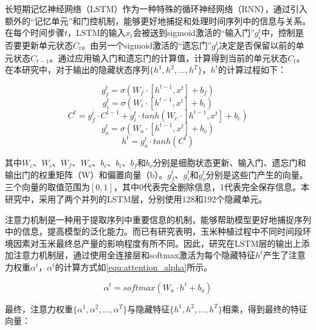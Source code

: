 \par 长短期记忆神经网络（LSTM）作为一种特殊的循环神经网络（RNN），通过引入额外的“记忆单元”和门控机制，能够更好地捕捉和处理时间序列中的信息与关系\cite{LI2019104785}。在每个时间步骤$t$，LSTM的输入$x_t$会被送到sigmoid激活的“输入门”$g_i^t$中，控制是否要更新单元状态$C_t$。由另一个sigmoid激活的“遗忘门”$g_f^t$决定是否保留以前的单元状态$C_{t-1}$。通过应用输入门和遗忘门的计算值，计算得到当前的单元状态$C_t$。在本研究中，对于输出的隐藏状态序列$\{h^1, h^2, ..., h^T\}$，$h^t$的计算过程如下：

\begin{equation}
  \label{equ:lstm1}
  g_f^t=\sigma (W_f\cdot [h^{t-1}, x^t]+b_f)
\end{equation}
\begin{equation}
  \label{equ:lstm2}
  g_i^t=\sigma (W_i\cdot [h^{t-1}, x^t]+b_i)
\end{equation}
\begin{equation}
  \label{equ:lstm3}
  C^t=g_f^t\cdot C^{t-1}+g_i^t\cdot tanh(W_c\cdot [h^{t-1}, x^t]+b_c)
\end{equation}
\begin{equation}
  \label{equ:lstm4}
  g_o^t=\sigma (W_o\cdot [h^{t-1}, x^t]+b_o)
\end{equation}
\begin{equation}
  \label{equ:lstm5}
  h^t=g_o^t\cdot tanh(C^t)
\end{equation}

\par 其中$W_c$、$W_i$、$W_f$、$W_o$、$b_c$、$b_i$、$b_f$和$b_o$分别是细胞状态更新、输入门、遗忘门和输出门的权重矩阵（W）和偏置向量（b）。$g_f^t$、$g_i^t$和$g_o^t$分别是这些门产生的向量。三个向量的取值范围为$[0,1]$，其中0代表完全删除信息，1代表完全保存信息。本研究中，采用了两个并列的LSTM层，分别使用128和192个隐藏单元。

\par 注意力机制是一种用于提取序列中重要信息的机制，能够帮助模型更好地捕捉序列中的信息，提高模型的泛化能力。而已有研究表明，玉米种植过程中不同时间段环境因素对玉米最终总产量的影响程度有所不同\cite{shook2021crop}。因此，研究在LSTM层的输出上添加注意力机制层，通过使用全连接层和softmax激活为每个隐藏特征$h^t$产生了注意力权重$\alpha ^t$，$\alpha ^t$的计算方式如\autoref{equ:attention_alpha}所示。

\begin{equation}
  \label{equ:attention_alpha}
  \alpha ^t=softmax (W_a\cdot h^t+b_a)
\end{equation}

\par 最终，注意力权重$\{\alpha ^1,\alpha ^2,..., \alpha ^T \}$与隐藏特征$\{h ^1,h ^2,..., h ^T \}$相乘，得到最终的特征向量：

